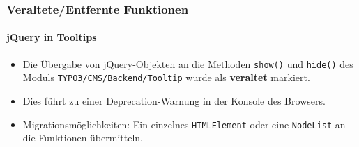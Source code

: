 %

\begin{frame}[fragile]
	\frametitle{Veraltete/Entfernte Funktionen}
	\framesubtitle{jQuery in Tooltips}


	\begin{itemize}
		\item Die Übergabe von jQuery-Objekten an die Methoden \texttt{show()} und \texttt{hide()}
			des Moduls \texttt{TYPO3/CMS/Backend/Tooltip} wurde als
			\textbf{veraltet} markiert.
		\item Dies führt zu einer Deprecation-Warnung in der Konsole des Browsers.
		\item Migrationsmöglichkeiten:
			Ein einzelnes \texttt{HTMLElement} oder eine \texttt{NodeList} an die
			Funktionen übermitteln.
	\end{itemize}

\end{frame}

